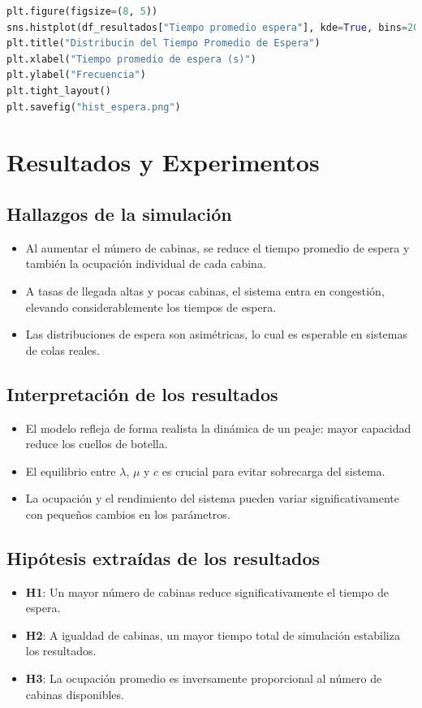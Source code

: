 \documentclass[12pt]{article}
\begin{document}
\begin{lstlisting}[language=Python, caption={Ejemplo de generación de gráfico}]
plt.figure(figsize=(8, 5))
sns.histplot(df_resultados["Tiempo promedio espera"], kde=True, bins=20)
plt.title("Distribucin del Tiempo Promedio de Espera")
plt.xlabel("Tiempo promedio de espera (s)")
plt.ylabel("Frecuencia")
plt.tight_layout()
plt.savefig("hist_espera.png")
\end{lstlisting}


\section{Resultados y Experimentos}

\subsection*{Hallazgos de la simulación}
\begin{itemize}
    \item Al aumentar el número de cabinas, se reduce el tiempo promedio de espera y también la ocupación individual de cada cabina.
    \item A tasas de llegada altas y pocas cabinas, el sistema entra en congestión, elevando considerablemente los tiempos de espera.
    \item Las distribuciones de espera son asimétricas, lo cual es esperable en sistemas de colas reales.
\end{itemize}

\subsection*{Interpretación de los resultados}
\begin{itemize}
    \item El modelo refleja de forma realista la dinámica de un peaje: mayor capacidad reduce los cuellos de botella.
    \item El equilibrio entre $\lambda$, $\mu$ y $c$ es crucial para evitar sobrecarga del sistema.
    \item La ocupación y el rendimiento del sistema pueden variar significativamente con pequeños cambios en los parámetros.
\end{itemize}

\subsection*{Hipótesis extraídas de los resultados}
\begin{itemize}
    \item \textbf{H1}: Un mayor número de cabinas reduce significativamente el tiempo de espera.
    \item \textbf{H2}: A igualdad de cabinas, un mayor tiempo total de simulación estabiliza los resultados.
    \item \textbf{H3}: La ocupación promedio es inversamente proporcional al número de cabinas disponibles.
\end{itemize}
\end{document}
